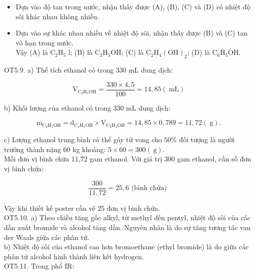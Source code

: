 \documentclass[10pt]{article}
\begin{document}
\begin{itemize}
  \item Dựa vào độ tan trong nước, nhận thấy được (A), (B), (C) và (D) có nhiệt độ sôi khác nhau không nhiều.
  \item Dựa vào sự khác nhau nhiều về nhiệt độ sôi, nhận thấy được (B) và (C) tan vô hạn trong nước.\\
Vậy (A) là $\mathrm{C}_{2} \mathrm{H}_{5}$ l; (B) là $\mathrm{C}_{2} \mathrm{H}_{5} \mathrm{OH}$; (C) là $\mathrm{C}_{2} \mathrm{H}_{4}(\mathrm{OH})_{2}$; (D) là $\mathrm{C}_{6} \mathrm{H}_{5} \mathrm{OH}$.
\end{itemize}

OT5.9. a) Thể tích ethanol có trong 330 mL dung dịch:

$$
\mathrm{V}_{\mathrm{C}_{2} \mathrm{H}_{5} \mathrm{OH}}=\frac{330 \times 4,5}{100}=14,85(\mathrm{~mL})
$$

b) Khối lượng của ethanol có trong 330 mL dung dịch:

$$
\mathrm{m}_{\mathrm{C}_{2} \mathrm{H}_{5} \mathrm{OH}}=\mathrm{d}_{\mathrm{C}_{2} \mathrm{H}_{5} \mathrm{OH}} \times \mathrm{V}_{\mathrm{C}_{2} \mathrm{H}_{5} \mathrm{OH}}=14,85 \times 0,789=11,72(\mathrm{~g}) .
$$

c) Lượng ethanol trung bình có thể gây tử vong cho $50 \%$ đối tượng là người trưởng thành nặng 60 kg khoảng: $5 \times 60=300(\mathrm{~g})$.\\
Mỗi đơn vị bình chứa 11,72 gam ethanol. Với giá trị 300 gam ethanol, cần số đơn vị bình chứa:

$$
\frac{300}{11,72}=25,6 \text { (bình chứa) }
$$

Vậy khi thiết kế poster cần vẽ 25 đơn vị bình chứa.\\
OT5.10. a) Theo chiều tăng gốc alkyl, từ methyl đến pentyl, nhiệt độ sôi của các dẫn xuất bromide và alcohol tăng dần. Nguyên nhân là do sự tăng tương tác van der Waals giữa các phân tử.\\
b) Nhiệt độ sôi của ethanol cao hơn bromoethane (ethyl bromide) là do giữa các phân tử alcohol hình thành liên kết hydrogen.\\
OT5.11. Trong phổ IR:
\end{document}
